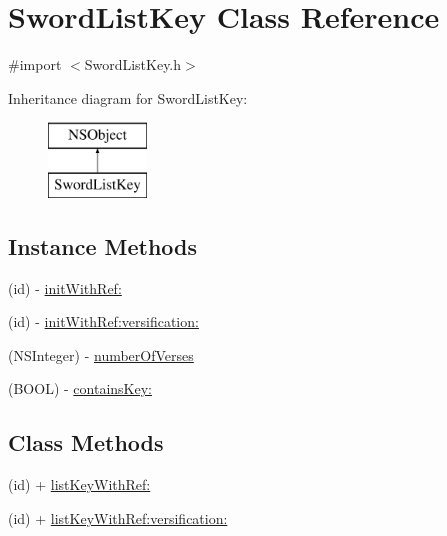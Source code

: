 \hypertarget{interface_sword_list_key}{\section{Sword\-List\-Key Class Reference}
\label{interface_sword_list_key}
}


{\ttfamily \#import $<$Sword\-List\-Key.\-h$>$}

Inheritance diagram for Sword\-List\-Key\-:\begin{figure}[H]
\begin{center}
\leavevmode
\includegraphics[height=2.000000cm]{interface_sword_list_key}
\end{center}
\end{figure}
\subsection*{Instance Methods}
\begin{DoxyCompactItemize}
\item 
(id) -\/ \hyperlink{interface_sword_list_key_adad6312529c38c4b79f047d53db2b1ac}{init\-With\-Ref\-:}
\item 
(id) -\/ \hyperlink{interface_sword_list_key_aaadf937711b8d0ce7541244bf01e532a}{init\-With\-Ref\-:versification\-:}
\item 
(N\-S\-Integer) -\/ \hyperlink{interface_sword_list_key_ae91c97de3601cee103b8639cc97716a0}{number\-Of\-Verses}
\item 
(B\-O\-O\-L) -\/ \hyperlink{interface_sword_list_key_a49a1ad3032b0738b21c93fe9c1706de7}{contains\-Key\-:}
\end{DoxyCompactItemize}
\subsection*{Class Methods}
\begin{DoxyCompactItemize}
\item 
(id) + \hyperlink{interface_sword_list_key_a3d675e500b329e87dbec8964616d73b4}{list\-Key\-With\-Ref\-:}
\item 
(id) + \hyperlink{interface_sword_list_key_a947af5e31127936f5964980a60b0a678}{list\-Key\-With\-Ref\-:versification\-:}
\end{DoxyCompactItemize}
